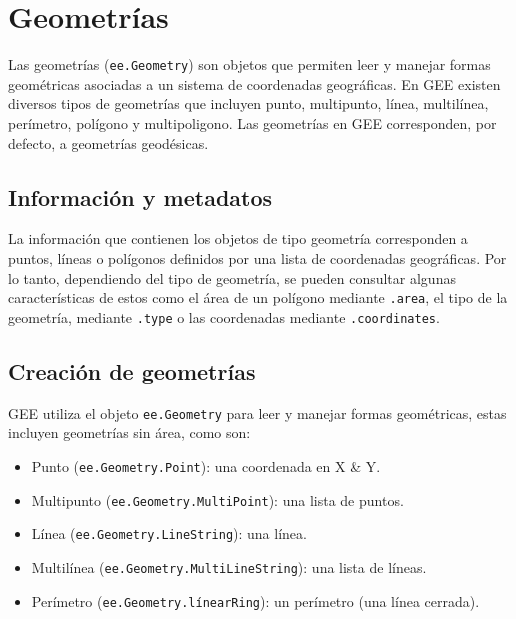 \documentclass[
  12pt,
  letterpaper,
  twoside]{book}
\providecommand{\tightlist}{%
  \setlength{\itemsep}{0pt}\setlength{\parskip}{0pt}}
\begin{document}
\newpage

\hypertarget{geometruxedas}{%
\chapter{Geometrías}\label{geometruxedas}}

Las geometrías (\texttt{ee.Geometry}) son objetos que permiten leer y manejar formas geométricas asociadas a un sistema de coordenadas geográficas. En GEE existen diversos tipos de geometrías que incluyen punto, multipunto, línea, multilínea, perímetro, polígono y multipoligono. Las geometrías en GEE corresponden, por defecto, a geometrías geodésicas.

\hypertarget{informaciuxf3n-y-metadatos}{%
\section{Información y metadatos}\label{informaciuxf3n-y-metadatos}}

La información que contienen los objetos de tipo geometría corresponden a puntos, líneas o polígonos definidos por una lista de coordenadas geográficas. Por lo tanto, dependiendo del tipo de geometría, se pueden consultar algunas características de estos como el área de un polígono mediante \texttt{.area}, el tipo de la geometría, mediante \texttt{.type} o las coordenadas mediante \texttt{.coordinates}.

\hypertarget{creaciuxf3n-de-geometruxedas}{%
\section{Creación de geometrías}\label{creaciuxf3n-de-geometruxedas}}

GEE utiliza el objeto \texttt{ee.Geometry} para leer y manejar formas geométricas, estas incluyen geometrías sin área, como son:

\begin{itemize}
\tightlist
\item
  Punto (\texttt{ee.Geometry.Point}): una coordenada en X \& Y.
\item
  Multipunto (\texttt{ee.Geometry.MultiPoint}): una lista de puntos.
\item
  Línea (\texttt{ee.Geometry.LineString}): una línea.
\item
  Multilínea (\texttt{ee.Geometry.MultiLineString}): una lista de líneas.
\item
  Perímetro (\texttt{ee.Geometry.línearRing}): un perímetro (una línea cerrada).
\end{itemize}
\end{document}

